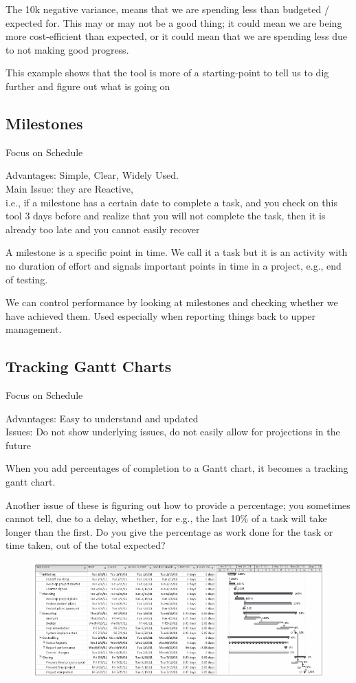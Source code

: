 \documentclass[]{project_plan}
\begin{document}
The 10k negative variance, means that we are spending less than budgeted /
expected for. This may or may not be a good thing; it could mean we are being
more cost-efficient than expected, or it could mean that we are spending less
due to not making good progress.

This example shows that the tool is more of a starting-point to tell us to
dig further and figure out what is going on

\subsection{Milestones}

Focus on Schedule

Advantages: Simple, Clear, Widely Used.\\
Main Issue: they are Reactive,\\
i.e., if a milestone has a certain date to
complete a task, and you check on this tool 3 days before and realize that you
will not complete the task, then it is already too late and you cannot easily recover

A milestone is a specific point in time. We call it a task but it is an
activity with no duration of effort and signals important points in time in a
project, e.g., end of testing.

We can control performance by looking at milestones and checking whether we have
achieved them. Used especially when reporting things back to upper management.

\subsection{Tracking Gantt Charts}

Focus on Schedule

Advantages: Easy to understand and updated\\
Issues: Do not show underlying issues, do not easily allow for projections in the future

When you add percentages of completion to a Gantt chart, it becomes a tracking
gantt chart.

Another issue of these is figuring out how to provide a percentage; you sometimes
cannot tell, due to a delay, whether, for e.g., the last 10\% of a task will
take longer than the first. Do you give the percentage as work done for the task
or time taken, out of the total expected?

\begin{figure}[H]
  \centering
  \includegraphics[width=\linewidth]{tracking gantt chart.png}
\end{figure}
\end{document}
